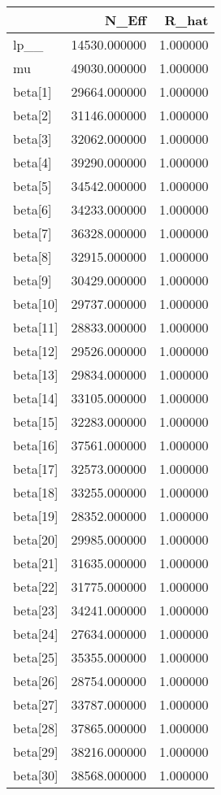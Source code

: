 \begin{tabular}{lrr}
\toprule
 & N_Eff & R_hat \\
\midrule
lp__ & 14530.000000 & 1.000000 \\
mu & 49030.000000 & 1.000000 \\
beta[1] & 29664.000000 & 1.000000 \\
beta[2] & 31146.000000 & 1.000000 \\
beta[3] & 32062.000000 & 1.000000 \\
beta[4] & 39290.000000 & 1.000000 \\
beta[5] & 34542.000000 & 1.000000 \\
beta[6] & 34233.000000 & 1.000000 \\
beta[7] & 36328.000000 & 1.000000 \\
beta[8] & 32915.000000 & 1.000000 \\
beta[9] & 30429.000000 & 1.000000 \\
beta[10] & 29737.000000 & 1.000000 \\
beta[11] & 28833.000000 & 1.000000 \\
beta[12] & 29526.000000 & 1.000000 \\
beta[13] & 29834.000000 & 1.000000 \\
beta[14] & 33105.000000 & 1.000000 \\
beta[15] & 32283.000000 & 1.000000 \\
beta[16] & 37561.000000 & 1.000000 \\
beta[17] & 32573.000000 & 1.000000 \\
beta[18] & 33255.000000 & 1.000000 \\
beta[19] & 28352.000000 & 1.000000 \\
beta[20] & 29985.000000 & 1.000000 \\
beta[21] & 31635.000000 & 1.000000 \\
beta[22] & 31775.000000 & 1.000000 \\
beta[23] & 34241.000000 & 1.000000 \\
beta[24] & 27634.000000 & 1.000000 \\
beta[25] & 35355.000000 & 1.000000 \\
beta[26] & 28754.000000 & 1.000000 \\
beta[27] & 33787.000000 & 1.000000 \\
beta[28] & 37865.000000 & 1.000000 \\
beta[29] & 38216.000000 & 1.000000 \\
beta[30] & 38568.000000 & 1.000000 \\

\end{tabular}

